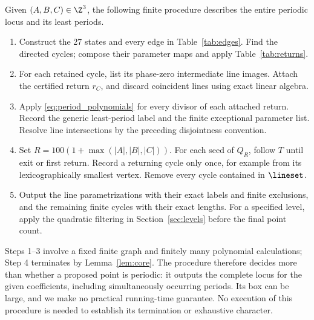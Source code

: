 \begin{procedure}\label{proc:atlas}
Given \((A,B,C)\in\Z^3\), the following finite procedure describes
the entire periodic locus and its least periods.
\begin{enumerate}
 \item Construct the 27 states and every edge in Table~\ref{tab:edges}.
 Find the directed cycles; compose their parameter maps and apply
 Table~\ref{tab:returns}.
 \item For each retained cycle, list its phase-zero intermediate
 line images. Attach the certified return \(r_C\), and discard
 coincident lines using exact linear algebra.
 \item Apply \eqref{eq:period_polynomials} for every divisor of each
 attached return. Record the generic least-period label and the
 finite exceptional parameter list. Resolve line intersections by
 the preceding disjointness convention.
 \item Set \(R=100(1+\max(|A|,|B|,|C|))\). For each seed of \(Q_R\),
 follow \(T\) until exit or first return. Record a returning cycle
 only once, for example from its lexicographically smallest vertex.
 Remove every cycle contained in \(\lineset\).
 \item Output the line parametrizations with their exact labels and
 finite exclusions, and the remaining finite cycles with their
 exact lengths. For a specified level, apply the quadratic filtering
 in Section~\ref{sec:levels} before the final point count.
\end{enumerate}
\end{procedure}

Steps 1--3 involve a fixed finite graph and finitely many polynomial
calculations; Step 4 terminates by Lemma~\ref{lem:core}. The procedure
therefore decides more than whether a proposed point is periodic: it
outputs the complete locus for the given coefficients, including
simultaneously occurring periods. Its box can be large, and we make
no practical running-time guarantee. No execution of this procedure
is needed to establish its termination or exhaustive character.
